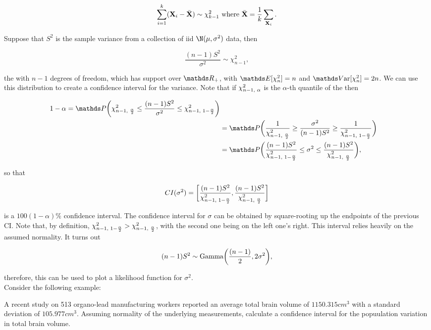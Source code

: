 \documentclass{homework}
\begin{document}
$$
\sum_{i=1}^{k} ({\bf X}_i - \bar{{\bf X}}) \sim \chi^2_{k-1} \textnormal{ where } \bar{{\bf X}} = \frac{1}{k} \sum_{{\bf X}_i}.
$$

Suppose that $S^2$ is the sample variance from a collection of iid $\N(\mu, \sigma^2)$ data, then 

$$
\frac{(n-1)S^2}{\sigma^2} \sim \chi^2_{n-1},
$$

the \chidis  with $n-1$ degrees of freedom, which has support over $\Rp$, with $\E[\chi^2_{n}] = n$ and $\var[\chi^2_{n}] = 2n$. We can use this distribution to create a confidence interval for the variance. Note that if $\chi^2_{n-1, \textnormal{ }\alpha}$ is the $\alpha$-th quantile of the \chidis then

\begin{align*}
1-\alpha = \prob\bigg(\chi^2_{n-1, \textnormal{ }\frac{\alpha}{2}} \leq \frac{(n-1)S^2}{\sigma^2} \leq \chi^2_{n-1, \textnormal{ }1-\frac{\alpha}{2}} \bigg) \\
&= \prob\bigg(\frac{1}{\chi^2_{n-1, \textnormal{ }\frac{\alpha}{2}}} \geq \frac{\sigma^2}{(n-1)S^2} \geq \frac{1}{\chi^2_{n-1, \textnormal{ }1-\frac{\alpha}{2}}} \bigg) \\
&= \prob\bigg(\frac{(n-1)S^2}{\chi^2_{n-1, \textnormal{ }1-\frac{\alpha}{2}}} \leq {\sigma^2} \leq \frac{(n-1)S^2}{\chi^2_{n-1, \textnormal{ }\frac{\alpha}{2}}} \bigg),
\end{align*}

so that 

$$
CI(\sigma^2) = \bigg[\frac{(n-1)S^2}{\chi^2_{n-1, \textnormal{ }1-\frac{\alpha}{2}}}, \frac{(n-1)S^2}{\chi^2_{n-1, \textnormal{ }\frac{\alpha}{2}}}\bigg] 
$$

is a $100(1-\alpha)\%$ confidence interval. The confidence interval for $\sigma$ can be obtained by square-rooting up the endpoints of the previous CI. Note that, by definition, $\chi^2_{n-1, \textnormal{ }1-\frac{\alpha}{2}} > \chi^2_{n-1, \textnormal{ }\frac{\alpha}{2}}$, with the second one being on the left one's right. This interval relies heavily on the assumed normality. It turns out 

$$
(n-1)S^2 \sim \textnormal{Gamma}\bigg(\frac{(n-1)}{2}, 2\sigma^2\bigg),
$$

therefore, this can be used to plot a likelihood function for $\sigma^2$. \\

Consider the following example:

\begin{tcolorbox}[title=Example of \chidis CI]

A recent study on 513 organo-lead manufacturing workers reported an average total brain volume of $1150.315 cm^3$ with a standard deviation of $105.977 cm^3$. Assuming normality of the underlying measurements, calculate a confidence interval for the popuulation variation in total brain volume. 

\end{tcolorbox}
\end{document}
